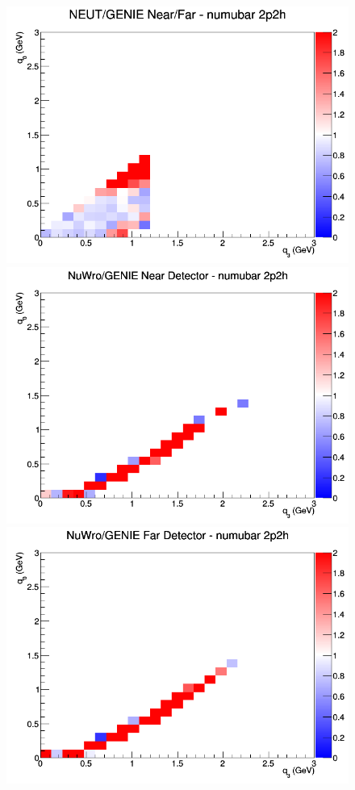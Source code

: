 \documentclass[12pt]{article}
\begin{document}
\begin{figure}[h]
\endminipage
{}
\includegraphics[width=\linewidth]{q0_q3/nominal/ratios/2p2h_NEUT_GENIE_numubar_NF_q3_q0.png}
\endminipage
\newline
{}
\includegraphics[width=\linewidth]{q0_q3/nominal/ratios/2p2h_NuWro_GENIE_numubar_near_q3_q0.png}
\endminipage
{}
\includegraphics[width=\linewidth]{q0_q3/nominal/ratios/2p2h_NuWro_GENIE_numubar_far_q3_q0.png}

\end{figure}
\end{document}
